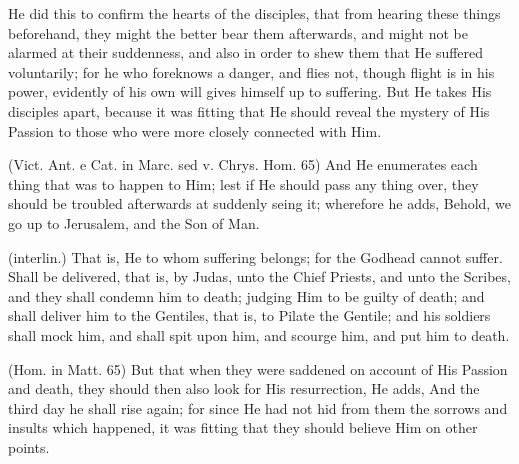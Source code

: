  He did this to confirm the hearts of the disciples, that from hearing these things beforehand, they might the better bear them afterwards, and might not be alarmed at their suddenness, and also in order to shew them that He suffered voluntarily; for he who foreknows a danger, and flies not, though flight is in his power, evidently of his own will gives himself up to suffering. But He takes His disciples apart, because it was fitting that He should reveal the mystery of His Passion to those who were more closely connected with Him.

 (Vict. Ant. e Cat. in Marc. sed v. Chrys. Hom. 65) And He enumerates each thing that was to happen to Him; lest if He should pass any thing over, they should be troubled afterwards at suddenly seing it; wherefore he adds, Behold, we go up to Jerusalem, and the Son of Man.

 (interlin.) That is, He to whom suffering belongs; for the Godhead cannot suffer. Shall be delivered, that is, by Judas, unto the Chief Priests, and unto the Scribes, and they shall condemn him to death; judging Him to be guilty of death; and shall deliver him to the Gentiles, that is, to Pilate the Gentile; and his soldiers shall mock him, and shall spit upon him, and scourge him, and put him to death.

 (Hom. in Matt. 65) But that when they were saddened on account of His Passion and death, they should then also look for His resurrection, He adds, And the third day he shall rise again; for since He had not hid from them the sorrows and insults which happened, it was fitting that they should believe Him on other points.

 

